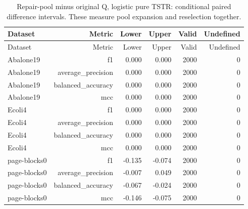 \begin{longtable}{lrrrrr}
\caption{Repair-pool minus original Q, logistic pure TSTR: conditional paired difference intervals. These measure pool expansion and reselection together.}\label{tab:paired}\\
\toprule
Dataset & Metric & Lower & Upper & Valid & Undefined \\
\midrule\endfirsthead
\toprule
Dataset & Metric & Lower & Upper & Valid & Undefined \\
\midrule\endhead
Abalone19 & f1 & 0.000 & 0.000 & 2000 & 0 \\
Abalone19 & average\_precision & 0.000 & 0.000 & 2000 & 0 \\
Abalone19 & balanced\_accuracy & 0.000 & 0.000 & 2000 & 0 \\
Abalone19 & mcc & 0.000 & 0.000 & 2000 & 0 \\
Ecoli4 & f1 & 0.000 & 0.000 & 2000 & 0 \\
Ecoli4 & average\_precision & 0.000 & 0.000 & 2000 & 0 \\
Ecoli4 & balanced\_accuracy & 0.000 & 0.000 & 2000 & 0 \\
Ecoli4 & mcc & 0.000 & 0.000 & 2000 & 0 \\
page-blocks0 & f1 & -0.135 & -0.074 & 2000 & 0 \\
page-blocks0 & average\_precision & -0.007 & 0.049 & 2000 & 0 \\
page-blocks0 & balanced\_accuracy & -0.067 & -0.024 & 2000 & 0 \\
page-blocks0 & mcc & -0.146 & -0.075 & 2000 & 0 \\
\bottomrule\end{longtable}
